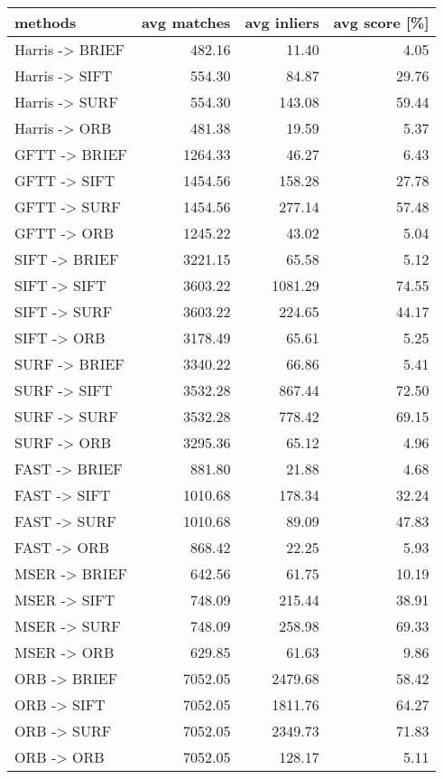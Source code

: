 \begin{tabular}{ l| r r r }
\label{tab_matchcount}
	methods & avg matches & avg inliers & avg score [\%] \\
	\hline
	 Harris -> BRIEF & 482.16 & 11.40 & 4.05 \\
	 Harris -> SIFT & 554.30 & 84.87 & 29.76 \\
	 Harris -> SURF & 554.30 & 143.08 & 59.44 \\
	 Harris -> ORB & 481.38 & 19.59 & 5.37 \\
	 GFTT -> BRIEF & 1264.33 & 46.27 & 6.43 \\
	 GFTT -> SIFT & 1454.56 & 158.28 & 27.78 \\
	 GFTT -> SURF & 1454.56 & 277.14 & 57.48 \\
	 GFTT -> ORB & 1245.22 & 43.02 & 5.04 \\
	 SIFT -> BRIEF & 3221.15 & 65.58 & 5.12 \\
	 SIFT -> SIFT & 3603.22 & 1081.29 & 74.55 \\
	 SIFT -> SURF & 3603.22 & 224.65 & 44.17 \\
	 SIFT -> ORB & 3178.49 & 65.61 & 5.25 \\
	 SURF -> BRIEF & 3340.22 & 66.86 & 5.41 \\
	 SURF -> SIFT & 3532.28 & 867.44 & 72.50 \\
	 SURF -> SURF & 3532.28 & 778.42 & 69.15 \\
	 SURF -> ORB & 3295.36 & 65.12 & 4.96 \\
	 FAST -> BRIEF & 881.80 & 21.88 & 4.68 \\
	 FAST -> SIFT & 1010.68 & 178.34 & 32.24 \\
	 FAST -> SURF & 1010.68 & 89.09 & 47.83 \\
	 FAST -> ORB & 868.42 & 22.25 & 5.93 \\
	 MSER -> BRIEF & 642.56 & 61.75 & 10.19 \\
	 MSER -> SIFT & 748.09 & 215.44 & 38.91 \\
	 MSER -> SURF & 748.09 & 258.98 & 69.33 \\
	 MSER -> ORB & 629.85 & 61.63 & 9.86 \\
	 ORB -> BRIEF & 7052.05 & 2479.68 & 58.42 \\
	 ORB -> SIFT & 7052.05 & 1811.76 & 64.27 \\
	 ORB -> SURF & 7052.05 & 2349.73 & 71.83 \\
	 ORB -> ORB & 7052.05 & 128.17 & 5.11
\end{tabular}